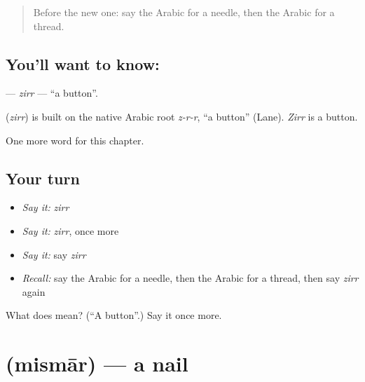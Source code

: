 \label{lesson:AR-C124-zirr}



\begin{quote}
Before the new one: say the Arabic for a needle, then the Arabic for a thread.
\end{quote}

\subsection*{You'll want to know: }
\textbf{} — \emph{zirr} — \textquotedblleft{}a button\textquotedblright{}.

\begin{cousinweb}
\textbf{} (\emph{zirr}) is built on the native Arabic root \emph{z-r-r}, \textquotedblleft{}a button\textquotedblright{} (Lane). \emph{Zirr} is a button.
\end{cousinweb}

\begin{grammarlens}[title={What you've built}]
One more word for this chapter.
\end{grammarlens}

\subsection*{Your turn}
\begin{itemize}
\raggedright
  \item \emph{Say it:} \emph{zirr}
  \item \emph{Say it:} \emph{zirr}, once more
  \item \emph{Say it:} say \emph{zirr}
  \item \emph{Recall:} say the Arabic for a needle, then the Arabic for a thread, then say \emph{zirr} again
\end{itemize}

\begin{tcolorbox}[breakable,colback=teal!4,colframe=teal!35!black,title={Before you move on}]
What does  mean? (\textquotedblleft{}A button\textquotedblright{}.) Say it once more.
\end{tcolorbox}
\section[\texorpdfstring{\ar{مسمار} (mismār)}{مسمار (mismār)}]{ (mismār) — a nail}

\label{lesson:AR-C124-mismar}



